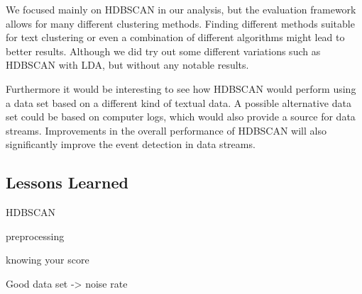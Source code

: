 We focused mainly on HDBSCAN in our analysis, but the evaluation framework allows for many different clustering methods.
Finding different methods suitable for text clustering
or even a combination of different algorithms might lead to better results.
Although we did try out some different variations such as HDBSCAN with LDA,
but without any notable results.

Furthermore it would be interesting to see how HDBSCAN would perform
using a data set based on a different kind of textual data.
A possible alternative data set could be based on computer logs,
which would also provide a source for data streams.
Improvements in the overall performance of HDBSCAN will also significantly improve the event detection in data streams.

\subsection{Lessons Learned}
\label{subsec:6_lessons_learned}


HDBSCAN

preprocessing


knowing your score


Good data set -> noise rate
